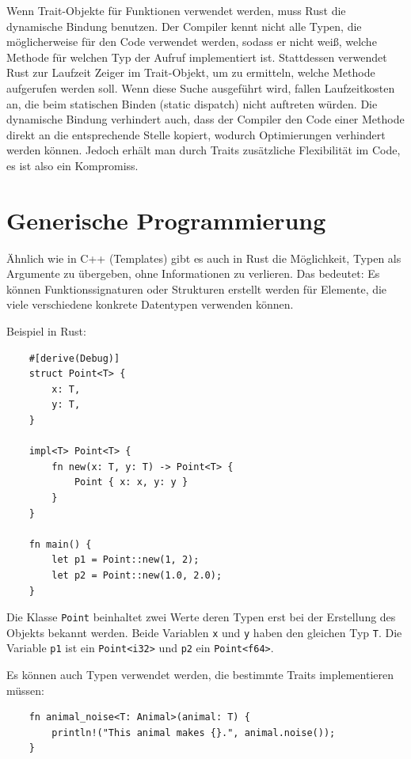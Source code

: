 Wenn Trait-Objekte für Funktionen verwendet werden, muss Rust die dynamische Bindung benutzen. Der Compiler kennt nicht alle Typen, die möglicherweise für den Code verwendet werden, sodass er nicht weiß, welche Methode für welchen Typ der Aufruf implementiert ist. Stattdessen verwendet Rust zur Laufzeit Zeiger im Trait-Objekt, um zu ermitteln, welche Methode aufgerufen werden soll. Wenn diese Suche ausgeführt wird, fallen Laufzeitkosten an, die beim statischen Binden (static dispatch) nicht auftreten würden. Die dynamische Bindung verhindert auch, dass der Compiler den Code einer Methode direkt an die entsprechende Stelle kopiert, wodurch Optimierungen verhindert werden können. Jedoch erhält man durch Traits zusätzliche Flexibilität im Code, es ist also ein Kompromiss.


\section{Generische Programmierung}

Ähnlich wie in C++ (Templates) gibt es auch in Rust die Möglichkeit, Typen als Argumente zu übergeben, ohne Informationen zu verlieren. Das bedeutet: Es können Funktionssignaturen oder Strukturen erstellt werden für Elemente, die viele verschiedene konkrete Datentypen verwenden können.

Beispiel in Rust:

\begin{lstlisting}
    #[derive(Debug)]
    struct Point<T> {
        x: T,
        y: T,
    }
    
    impl<T> Point<T> {
        fn new(x: T, y: T) -> Point<T> {
            Point { x: x, y: y }
        }
    }
    
    fn main() {
        let p1 = Point::new(1, 2);
        let p2 = Point::new(1.0, 2.0);
    }
\end{lstlisting}

Die Klasse \verb"Point" beinhaltet zwei Werte deren Typen erst bei der Erstellung des Objekts bekannt werden. Beide Variablen \verb"x" und \verb"y" haben den gleichen Typ \verb"T". Die Variable \verb"p1" ist ein \verb"Point<i32>" und \verb"p2" ein \verb"Point<f64>".

Es können auch Typen verwendet werden, die bestimmte Traits implementieren müssen:

\begin{lstlisting}
    fn animal_noise<T: Animal>(animal: T) {
        println!("This animal makes {}.", animal.noise());
    }
\end{lstlisting}


